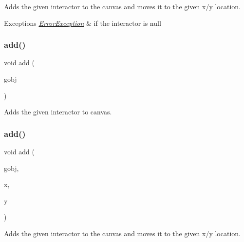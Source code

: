 Adds the given interactor to the canvas and moves it to the given x/y location. 


\begin{DoxyExceptions}{Exceptions}
{\em \mbox{\hyperlink{classErrorException}{Error\+Exception}}} & if the interactor is null \\
\hline
\end{DoxyExceptions}
\mbox{\label{classGCanvas_ac732fc2123d7a6d7e2de145fe9bbd8e8}} 
\subsubsection{\texorpdfstring{add()}{add()}\hspace{0.1cm}{\footnotesize\ttfamily [3/4]}}
{\footnotesize\ttfamily void add (\begin{DoxyParamCaption}\item[{\mbox{\hyperlink{classGObject}{G\+Object}} \&}]{gobj }\end{DoxyParamCaption})\hspace{0.3cm}{\ttfamily [virtual]}}



Adds the given interactor to canvas. 

\mbox{\label{classGCanvas_a5b11b532869632a6c26b098b0858eac5}} 
\subsubsection{\texorpdfstring{add()}{add()}\hspace{0.1cm}{\footnotesize\ttfamily [4/4]}}
{\footnotesize\ttfamily void add (\begin{DoxyParamCaption}\item[{\mbox{\hyperlink{classGObject}{G\+Object}} \&}]{gobj,  }\item[{double}]{x,  }\item[{double}]{y }\end{DoxyParamCaption})\hspace{0.3cm}{\ttfamily [virtual]}}



Adds the given interactor to the canvas and moves it to the given x/y location. 

\mbox{\label{classGInteractor_a02f20ea6edfa0671f31c4c648a253833}} 
